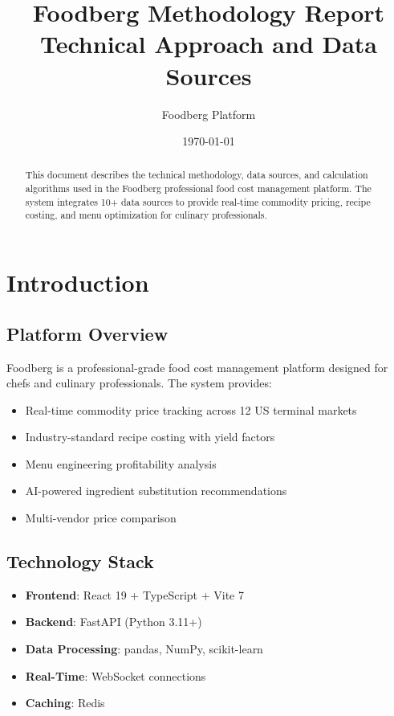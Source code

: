 \documentclass[11pt,a4paper]{article}
\title{Foodberg Methodology Report\\
\large Technical Approach and Data Sources}
\author{Foodberg Platform}
\date{\today}
\begin{document}
\maketitle

\begin{abstract}
This document describes the technical methodology, data sources, and calculation algorithms used in the Foodberg professional food cost management platform. The system integrates 10+ data sources to provide real-time commodity pricing, recipe costing, and menu optimization for culinary professionals.
\end{abstract}

\tableofcontents
\newpage

\section{Introduction}

\subsection{Platform Overview}
Foodberg is a professional-grade food cost management platform designed for chefs and culinary professionals. The system provides:

\begin{itemize}
    \item Real-time commodity price tracking across 12 US terminal markets
    \item Industry-standard recipe costing with yield factors
    \item Menu engineering profitability analysis
    \item AI-powered ingredient substitution recommendations
    \item Multi-vendor price comparison
\end{itemize}

\subsection{Technology Stack}
\begin{itemize}
    \item \textbf{Frontend}: React 19 + TypeScript + Vite 7
    \item \textbf{Backend}: FastAPI (Python 3.11+)
    \item \textbf{Data Processing}: pandas, NumPy, scikit-learn
    \item \textbf{Real-Time}: WebSocket connections
    \item \textbf{Caching}: Redis
\end{itemize}
\end{document}
